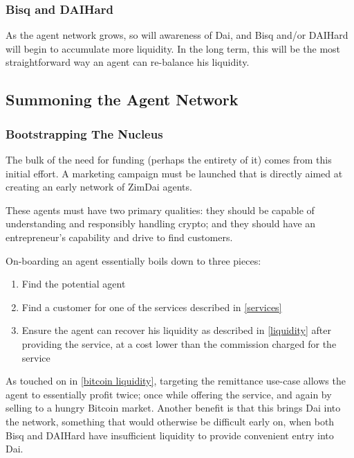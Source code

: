 \documentclass{article}
\begin{document}
\subsubsection{Bisq and DAIHard} \label{exchanges insufficient}

As the agent network grows, so will awareness of Dai, and Bisq and/or DAIHard will begin to accumulate more liquidity. In the long term, this will be the most straightforward way an agent can re-balance his liquidity.

\subsection{Summoning the Agent Network} \label{summoning}

\subsubsection{Bootstrapping The Nucleus} \label{bootstrapping}

The bulk of the need for funding (perhaps the entirety of it) comes from this initial effort. A marketing campaign must be launched that is directly aimed at creating an early network of ZimDai agents.

These agents must have two primary qualities: they should be capable of understanding and responsibly handling crypto; and they should have an entrepreneur's capability and drive to find customers.

On-boarding an agent essentially boils down to three pieces:

\begin{enumerate}
	\item Find the potential agent
	\item Find a customer for one of the services described in \ref{services}
	\item Ensure the agent can recover his liquidity as described in \ref{liquidity} after providing the service, at a cost lower than the commission charged for the service
\end{enumerate}

As touched on in \ref{bitcoin liquidity}, targeting the remittance use-case allows the agent to essentially profit twice; once while offering the service, and again by selling to a hungry Bitcoin market. Another benefit is that this brings Dai into the network, something that would otherwise be difficult early on, when both Bisq and DAIHard have insufficient liquidity to provide convenient entry into Dai.
\end{document}
